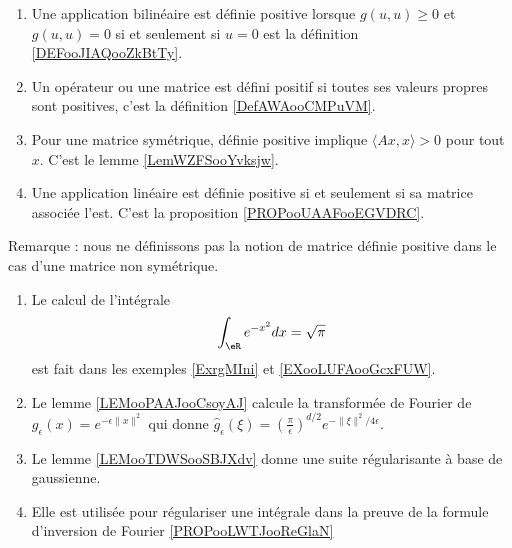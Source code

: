 \begin{enumerate}
    \item
        Une application bilinéaire est définie positive lorsque \( g(u,u)\geq 0\) et \( g(u,u)=0\) si et seulement si \( u=0\) est la définition \ref{DEFooJIAQooZkBtTy}.
    \item
        Un opérateur ou une matrice est défini positif si toutes ses valeurs propres sont positives, c'est la définition \ref{DefAWAooCMPuVM}.
    \item
        Pour une matrice symétrique, définie positive implique \( \langle Ax, x\rangle >0\) pour tout \( x\). C'est le lemme \ref{LemWZFSooYvksjw}.
    \item
        Une application linéaire est définie positive si et seulement si sa matrice associée l'est. C'est la proposition \ref{PROPooUAAFooEGVDRC}.
\end{enumerate}
Remarque : nous ne définissons pas la notion de matrice définie positive dans le cas d'une matrice non symétrique.

\begin{enumerate}
    \item
        Le calcul de l'intégrale
        \begin{equation}
            \int_{\eR} e^{-x^2}dx=\sqrt{\pi }
        \end{equation}
        est fait dans les exemples \ref{ExrgMIni} et \ref{EXooLUFAooGcxFUW}.
    \item
        Le lemme \ref{LEMooPAAJooCsoyAJ} calcule la transformée de Fourier de $ g_{\epsilon}(x)=  e^{-\epsilon\| x \|^2}$ qui donne $\hat g_{\epsilon}(\xi)=\left( \frac{ \pi }{ \epsilon } \right)^{d/2} e^{-\| \xi \|^2/4\epsilon}$.
    \item
        Le lemme \ref{LEMooTDWSooSBJXdv} donne une suite régularisante à base de gaussienne.
    \item
        Elle est utilisée pour régulariser une intégrale dans la preuve de la formule d'inversion de Fourier \ref{PROPooLWTJooReGlaN}
\end{enumerate}


